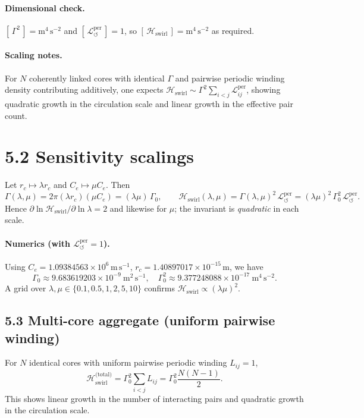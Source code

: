 \documentclass[11pt]{article}
\begin{document}
\paragraph{Dimensional check.}
    \([\,\Gamma^2\,]=\mathrm{m^4\,s^{-2}}\) and \([\,\mathcal{L}_{\circlearrowleft}^{\mathrm{per}}\,]=1\),
    so \([\,\mathcal{H}_{\text{swirl}}\,]=\mathrm{m^4\,s^{-2}}\) as required.

\paragraph{Scaling notes.}
    For $N$ coherently linked cores with identical $\Gamma$ and pairwise periodic winding density contributing additively, one expects
    $ \mathcal{H}_{\text{swirl}}\sim \Gamma^2 \sum_{i<j}\mathcal{L}_{ij}^{\mathrm{per}} $,
    showing quadratic growth in the circulation scale and linear growth in the effective pair count.

\section*{5.2 Sensitivity scalings}
Let $r_c \mapsto \lambda r_c$ and $C_e \mapsto \mu C_e$. Then
\[
    \Gamma(\lambda,\mu) = 2\pi (\lambda r_c)(\mu C_e) = (\lambda\mu)\,\Gamma_0,\qquad
    \mathcal{H}_{\text{swirl}}(\lambda,\mu) = \Gamma(\lambda,\mu)^2\,\mathcal{L}_{\circlearrowleft}^{\mathrm{per}}
    = (\lambda\mu)^2\,\Gamma_0^2 \,\mathcal{L}_{\circlearrowleft}^{\mathrm{per}}.
\]
Hence $\partial\ln\mathcal{H}_{\text{swirl}}/\partial\ln\lambda = 2$ and likewise for $\mu$; the invariant is \emph{quadratic} in each scale.

\paragraph{Numerics (with $\mathcal{L}_{\circlearrowleft}^{\mathrm{per}}=1$).}
    Using $C_e=1.09384563\times10^6\,\mathrm{m\,s^{-1}}$, $r_c=1.40897017\times10^{-15}\,\mathrm{m}$, we have
    \[
        \Gamma_0 \approx 9.683619203\times10^{-9}\ \mathrm{m^2\,s^{-1}},
        \quad
        \Gamma_0^2 \approx 9.377248088\times10^{-17}\ \mathrm{m^4\,s^{-2}}.
    \]
    A grid over $\lambda,\mu\in\{0.1,0.5,1,2,5,10\}$ confirms $\mathcal{H}_{\text{swirl}} \propto (\lambda\mu)^2$.

\subsection*{5.3 Multi-core aggregate (uniform pairwise winding)}
For $N$ identical cores with uniform pairwise periodic winding $L_{ij}=1$,
\[
    \mathcal{H}_{\text{swirl}}^{\text{(total)}}
    = \Gamma_0^2 \sum_{i<j} L_{ij}
    = \Gamma_0^2 \frac{N(N-1)}{2}.
\]
This shows linear growth in the number of interacting pairs and quadratic growth in the circulation scale.
\end{document}
